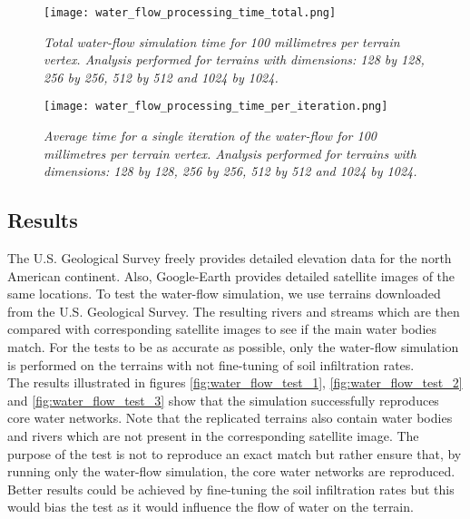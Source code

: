 \begin{figure}
\center
	\texttt{[image: water\_flow\_processing\_time\_total.png]}
	\caption{ \textit{Total water-flow simulation time for 100 millimetres per terrain vertex. Analysis performed for terrains with dimensions: 128 by 128, 256 by 256, 512 by 512 and 1024 by 1024.}}
	\label{fig:water_flow_processing_time_total}
\end{figure}

\begin{figure}
\center
	\texttt{[image: water\_flow\_processing\_time\_per\_iteration.png]}
	\caption{ \textit{Average time for a single iteration of the water-flow for 100 millimetres per terrain vertex. Analysis performed for terrains with dimensions: 128 by 128, 256 by 256, 512 by 512 and 1024 by 1024.}}
	\label{fig:water_flow_processing_time_per_iteration}
\end{figure}

\subsection{Results}

The U.S. Geological Survey \protect\footnotemark {}  freely provides detailed elevation data for the north American continent. Also, Google-Earth \protect\footnotemark {} provides detailed satellite images of the same locations. To test the water-flow simulation, we use terrains downloaded from the U.S. Geological Survey. The resulting rivers and streams which are then compared with corresponding satellite images to see if the main water bodies match. For the tests to be as accurate as possible, only the water-flow simulation is performed on the terrains with not fine-tuning of soil infiltration rates. \\
The results illustrated in figures \ref{fig:water_flow_test_1}, \ref{fig:water_flow_test_2} and \ref{fig:water_flow_test_3} show that the simulation successfully reproduces core water networks. Note that the replicated terrains also contain water bodies and rivers which are not present in the corresponding satellite image. The purpose of the test is not to reproduce an exact match but rather ensure that, by running only the water-flow simulation, the core water networks are reproduced. Better results could be achieved by fine-tuning the soil infiltration rates but this would bias the test as it would influence the flow of water on the terrain.

